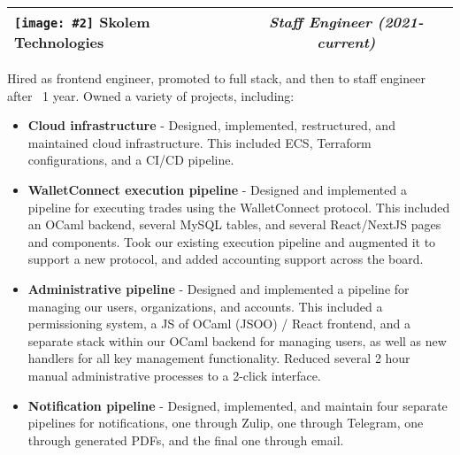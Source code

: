 \documentclass[letterpaper,10pt]{article}
\makeatletter
\newcommand{\sectiontitle}[2]{%
  \begin{tabularx}{\linewidth}{@{} X c @{}}
    {\sffamily\textbf{#1}} & {\rmfamily\textit{#2}} \\ \hline
  \end{tabularx}%
  \vspace{3pt}%
}
\newcommand{\inlineimg}[2][width=0.4cm]{%
  \begin{adjustbox}{raise=-0.2\height}%
    \texttt{[image: \#2]}%
  \end{adjustbox}%
}
\makeatother
\begin{document}
\newlength{\firstcolwidth}
\newlength{\secondcolwidth}
\setlength{\firstcolwidth}{\dimexpr(2\textwidth - 3\columnsep)/3\relax}
\setlength{\secondcolwidth}{\dimexpr(\textwidth - \columnsep)/3\relax}

\setlength{\arrayrulewidth}{0.1pt}

\begin{minipage}[t]{\firstcolwidth}
  \sectiontitle{\inlineimg[width=11pt]{assets/skolem.png} Skolem Technologies}{Staff Engineer (2021-current)}
  Hired as frontend engineer, promoted to full stack, and then to staff engineer after ~1 year. Owned a variety of projects, including:
  \begin{itemize}[leftmargin=*,itemsep=2pt,topsep=0pt]
    \item \textbf{Cloud infrastructure} - Designed, implemented, restructured, and maintained cloud infrastructure. This included ECS, Terraform configurations, and a CI/CD pipeline.
    \item \textbf{WalletConnect execution pipeline} - Designed and implemented a pipeline for executing trades using the WalletConnect protocol. This included an OCaml backend, several MySQL tables, and several React/NextJS pages and components. Took our existing execution pipeline and augmented it to support a new protocol, and added accounting support across the board.
    \item \textbf{Administrative pipeline} - Designed and implemented a pipeline for managing our users, organizations, and accounts. This included a permissioning system, a JS of OCaml (JSOO) / React frontend, and a separate stack within our OCaml backend for managing users, as well as new handlers for all key management functionality. Reduced several 2 hour manual administrative processes to a 2-click interface.
    \item \textbf{Notification pipeline} - Designed, implemented, and maintain four separate pipelines for notifications, one through Zulip, one through Telegram, one through generated PDFs, and the final one through email.
  \end{itemize}



\end{minipage}
\end{document}
